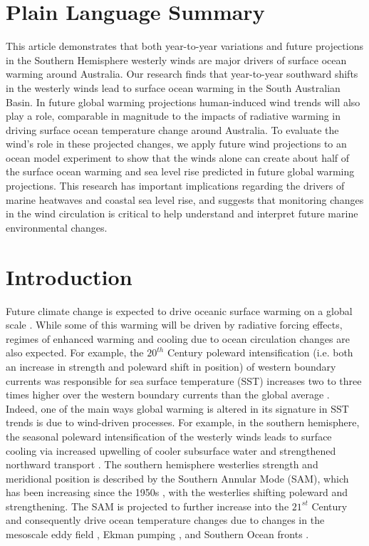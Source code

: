 \documentclass[draft,linenumbers]{agujournal2018}
\begin{document}
\section*{Plain Language Summary}
This article demonstrates that both year-to-year variations and future projections in the Southern Hemisphere westerly winds are major drivers of surface ocean warming around Australia. Our research finds that year-to-year southward shifts in the westerly winds lead to surface ocean warming in the South Australian Basin. In future global warming projections human-induced wind trends will also play a role, comparable in magnitude to the impacts of radiative warming in driving surface ocean temperature change around Australia. To evaluate the wind's role in these projected changes, we apply future wind projections to an ocean model experiment to show that the winds alone can create about half of the surface ocean warming and sea level rise predicted in future global warming projections. This research has important implications regarding the drivers of marine heatwaves and coastal sea level rise, and suggests that monitoring changes in the wind circulation is critical to help understand and interpret future marine environmental changes.

\section{Introduction}
Future climate change is expected to drive oceanic surface warming on a global scale \citep{Stocker2013}. While some of this warming will be driven by radiative forcing effects, regimes of enhanced warming and cooling due to ocean circulation changes are also expected. For example, the $20^{th}$ Century poleward intensification (i.e. both an increase in strength and poleward shift in position) of western boundary currents was responsible for sea surface temperature (SST) increases two to three times higher over the western boundary currents than the global average \citep{Wu2012}. Indeed, one of the main ways global warming is altered in its signature in SST trends is due to wind-driven processes. For example, in the southern hemisphere, the seasonal poleward intensification of the westerly winds leads to surface cooling via increased upwelling of cooler subsurface water and strengthened northward transport \citep{Purich2016}. The southern hemisphere westerlies strength and meridional position is described by the Southern Annular Mode (SAM), which has been increasing since the 1950s \citep{Marshall2003}, with the westerlies shifting poleward and strengthening. The SAM is projected to further increase into the $21^{st}$ Century \citep{Gillett2013} and consequently drive ocean temperature changes due to changes in the mesoscale eddy field \citep{Screen2009}, Ekman pumping \citep{Purich2016}, and Southern Ocean fronts \citep{Spence2010}.
\end{document}
